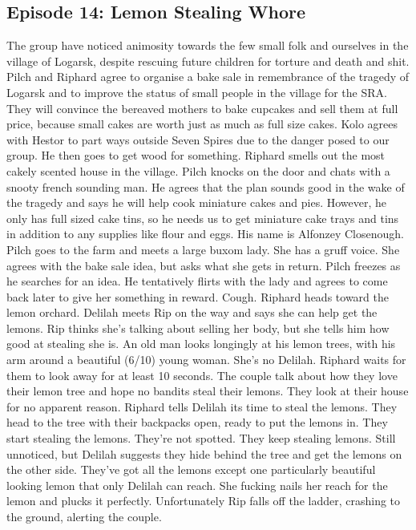 \subsection{Episode 14: Lemon Stealing Whore}
The group have noticed animosity towards the few small folk and ourselves in the village of Logarsk, despite rescuing future children for torture and death and shit.\medskip
Pilch and Riphard agree to organise a bake sale in remembrance of the tragedy of Logarsk and to improve the status of small people in the village for the SRA. They will convince the bereaved mothers to bake cupcakes and sell them at full price, because small cakes are worth just as much as full size cakes.\medskip
Kolo agrees with Hestor to part ways outside Seven Spires due to the danger posed to our group. He then goes to get wood for something. Riphard smells out the most cakely scented house in the village. Pilch knocks on the door and chats with a snooty french sounding man. He agrees that the plan sounds good in the wake of the tragedy and says he will help cook miniature cakes and pies. However, he only has full sized cake tins, so he needs us to get miniature cake trays and tins in addition to any supplies like flour and eggs. His name is Alfonzey Closenough.\medskip
Pilch goes to the farm and meets a large buxom lady. She has a gruff voice. She agrees with the bake sale idea, but asks what she gets in return. Pilch freezes as he searches for an idea. He tentatively flirts with the lady and agrees to come back later to give her something in reward. Cough.\medskip
Riphard heads toward the lemon orchard. Delilah meets Rip on the way and says she can help get the lemons. Rip thinks she’s talking about selling her body, but she tells him how good at stealing she is.\medskip
An old man looks longingly at his lemon trees, with his arm around a beautiful (6/10) young woman. She’s no Delilah. Riphard waits for them to look away for at least 10 seconds. The couple talk about how they love their lemon tree and hope no bandits steal their lemons. They look at their house for no apparent reason.\medskip
Riphard tells Delilah its time to steal the lemons. They head to the tree with their backpacks open, ready to put the lemons in.\medskip
They start stealing the lemons. They’re not spotted. They keep stealing lemons. Still unnoticed, but Delilah suggests they hide behind the tree and get the lemons on the other side. They’ve got all the lemons except one particularly beautiful looking lemon that only Delilah can reach. She fucking nails her reach for the lemon and plucks it perfectly. Unfortunately Rip falls off the ladder, crashing to the ground, alerting the couple.\medskip
